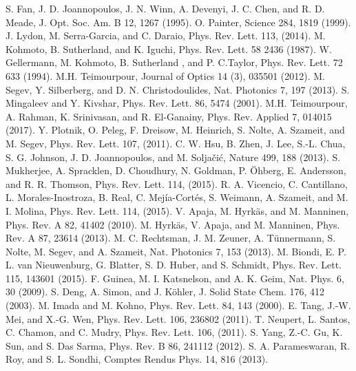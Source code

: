 \documentclass[aps,prl,twocolumn,showpacs,groupedaddress,amsmath,amssymb]{revtex4}
\begin{document}
\begin{thebibliography}{99}

	S. Fan, J. D. Joannopoulos, J. N. Winn, A. Devenyi, J. C. Chen, and R. D. Meade, J. Opt. Soc. Am. B 12, 1267 (1995).
	O. Painter, Science 284, 1819 (1999).
	J. Lydon, M. Serra-Garcia, and C. Daraio, Phys. Rev. Lett. 113, (2014).
 M. Kohmoto, B. Sutherland, and K. Iguchi, Phys. Rev. Lett. 58 2436 (1987).
  W. Gellermann, M. Kohmoto, B. Sutherland , and P. C.Taylor, Phys. Rev. Lett. 72 633 (1994).
 M.H. Teimourpour, Journal of Optics 14 (3), 035501 (2012).
	M. Segev, Y. Silberberg, and D. N. Christodoulides, Nat. Photonics 7, 197 (2013).
	S. Mingaleev and Y. Kivshar, Phys. Rev. Lett. 86, 5474 (2001).
 M.H. Teimourpour, A. Rahman, K. Srinivasan, and  R. El-Ganainy, Phys. Rev. Applied 7, 014015 (2017).
	Y. Plotnik, O. Peleg, F. Dreisow, M. Heinrich, S. Nolte, A. Szameit, and M. Segev, Phys. Rev. Lett. 107, (2011).
	C. W. Hsu, B. Zhen, J. Lee, S.-L. Chua, S. G. Johnson, J. D. Joannopoulos, and M. Solja\v{c}i\'{c}, Nature 499, 188 (2013).
	S. Mukherjee, A. Spracklen, D. Choudhury, N. Goldman, P. \"{O}hberg, E. Andersson, and R. R. Thomson, Phys. Rev. Lett. 114, (2015).
	R. A. Vicencio, C. Cantillano, L. Morales-Inostroza, B. Real, C. Mej\'{i}a-Cort\'{e}s, S. Weimann, A. Szameit, and M. I. Molina, Phys. Rev. Lett. 114, (2015).
	V. Apaja, M. Hyrk\"{a}s, and M. Manninen, Phys. Rev. A 82, 41402 (2010).
	M. Hyrk\"{a}s, V. Apaja, and M. Manninen, Phys. Rev. A 87, 23614 (2013).
	M. C. Rechtsman, J. M. Zeuner, A. T\"{u}nnermann, S. Nolte, M. Segev, and A. Szameit, Nat. Photonics 7, 153 (2013).
	M. Biondi, E. P. L. van Nieuwenburg, G. Blatter, S. D. Huber, and S. Schmidt, Phys. Rev. Lett. 115, 143601 (2015).
	F. Guinea, M. I. Katsnelson, and A. K. Geim, Nat. Phys. 6, 30 (2009).
	S. Deng, A. Simon, and J. K\"{o}hler, J. Solid State Chem. 176, 412 (2003).
	M. Imada and M. Kohno, Phys. Rev. Lett. 84, 143 (2000).
	E. Tang, J.-W. Mei, and X.-G. Wen, Phys. Rev. Lett. 106, 236802 (2011).
	T. Neupert, L. Santos, C. Chamon, and C. Mudry, Phys. Rev. Lett. 106, (2011).
	S. Yang, Z.-C. Gu, K. Sun, and S. Das Sarma, Phys. Rev. B 86, 241112 (2012).
	S. A. Parameswaran, R. Roy, and S. L. Sondhi, Comptes Rendus Phys. 14, 816 (2013).

\end{thebibliography}
\end{document}
